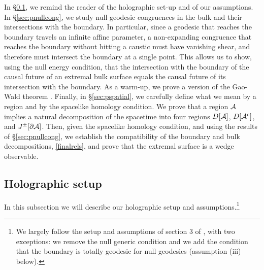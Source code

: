 \documentclass[12pt]{article}
\def\regA{{\cal A}}
\def\regAc{{\cal A}^c}
\begin{document}
In \S\ref{sec:psetup}, we remind the reader of the holographic set-up and of our assumptions. In \S\ref{sec:pnullcong}, we study null geodesic congruences in the bulk and their intersections with the boundary. In particular, since a geodesic that reaches the boundary travels an infinite affine parameter, a non-expanding congruence that reaches the boundary without hitting a caustic must have vanishing shear, and therefore must intersect the boundary at a single point. This allows us to show, using the null energy condition, that the intersection with the boundary of the causal future of an extremal bulk surface equals the causal future of its intersection with the boundary. As a warm-up, we prove a version of the Gao-Wald theorem \cite{Gao:2000ga}. Finally, in \S\ref{sec:pspatial}, we carefully define what we mean by a region and by the spacelike homology condition. We prove that a region $\regA$ implies a natural decomposition of the spacetime into four regions $D[\regA]$, $D[\regAc]$, and $J^\pm[\partial\regA]$. Then, given the spacelike homology condition, and using the results of \S\ref{sec:pnullcong}, we establish the compatibility of the boundary and bulk decompositions, \eqref{finalrels}, and prove that the extremal surface is a wedge observable.


\subsection{Holographic setup}
\label{sec:psetup}

In this subsection we will describe our holographic setup and assumptions.\footnote{ We largely follow the setup and assumptions of section 3 of \cite{Gao:2000ga}, with two exceptions: we remove the null generic condition and we add the condition that the boundary is totally geodesic for null geodesics (assumption (iii) below).}
\end{document}
